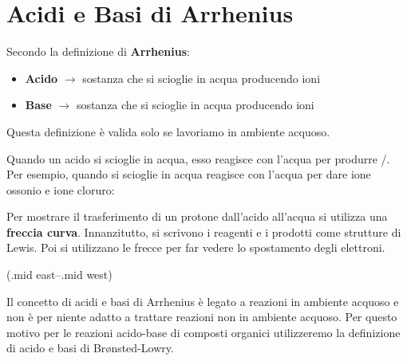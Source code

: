 \section{Acidi e Basi di Arrhenius}
\noindent Secondo la definizione di \textbf{Arrhenius}:
\begin{itemize}
	\item[] \textbf{Acido} \(\rightarrow\) sostanza che si scioglie in acqua producendo ioni 
	\item[] \textbf{Base} \(\rightarrow\) sostanza che si scioglie in acqua producendo ioni 
\end{itemize}
Questa definizione è valida solo se lavoriamo in ambiente acquoso.

Quando un acido si scioglie in acqua, esso reagisce con l'acqua per produrre /. Per esempio, quando  si scioglie in acqua reagisce con l'acqua per dare ione ossonio e ione cloruro:


\begin{center}
\end{center}

Per mostrare il trasferimento di un protone dall'acido all'acqua si utilizza una \textbf{freccia curva}. Innanzitutto, si scrivono i reagenti e i prodotti come strutture di Lewis. Poi si utilizzano le frecce per far vedere lo spostamento degli elettroni.

\begin{reactions}
	\+ 
	\arrow(.mid east--.mid west)
	\+ 
\end{reactions}

Il concetto di acidi e basi di Arrhenius è legato a reazioni in ambiente acquoso e non è per niente adatto a trattare reazioni non in ambiente acquoso. Per questo motivo per le reazioni acido-base di composti organici utilizzeremo la definizione di acido e basi di Br{\o}nsted-Lowry.